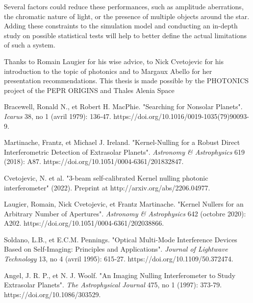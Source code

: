 \documentclass[]{spie}  %
\begin{document}
Several factors could reduce these performances, such as amplitude aberrations, the chromatic nature of light, or the presence of multiple objects around the star. Adding these constraints to the simulation model and conducting an in-depth study on possible statistical tests will help to better define the actual limitations of such a system.

\acknowledgments

Thanks to Romain Laugier for his wise advice, to Nick Cvetojevic for his introduction to the topic of photonics and to Margaux Abello for her presentation recommendations. This thesis is made possible by the PHOTONICS project of the PEPR ORIGINS and Thales Alenia Space



\begin{thebibliography}{60}

     Bracewell, Ronald N., et Robert H. MacPhie. "Searching for Nonsolar Planets". {\it Icarus} 38, no 1 (avril 1979): 136‑47. https://doi.org/10.1016/0019-1035(79)90093-9.

      Martinache, Frantz, et Michael J. Ireland. "Kernel-Nulling for a Robust Direct Interferometric Detection of Extrasolar Planets". {\it Astronomy \& Astrophysics} 619 (2018): A87. https://doi.org/10.1051/0004-6361/201832847.
    
    
     Cvetojevic, N. et al. "3-beam self-calibrated Kernel nulling photonic interferometer" (2022). Preprint at http://arxiv.org/abs/2206.04977.

     Laugier, Romain, Nick Cvetojevic, et Frantz Martinache. "Kernel Nullers for an Arbitrary Number of Apertures". {\it Astronomy \& Astrophysics} 642 (octobre 2020): A202. https://doi.org/10.1051/0004-6361/202038866.

     Soldano, L.B., et E.C.M. Pennings. "Optical Multi-Mode Interference Devices Based on Self-Imaging: Principles and Applications". {\it Journal of Lightwave Technology} 13, no 4 (avril 1995): 615‑27. https://doi.org/10.1109/50.372474.

     Angel, J. R. P., et N. J. Woolf. "An Imaging Nulling Interferometer to Study Extrasolar Planets". {\it The Astrophysical Journal} 475, no 1 (1997): 373‑79. https://doi.org/10.1086/303529.


\end{thebibliography}
\end{document}
